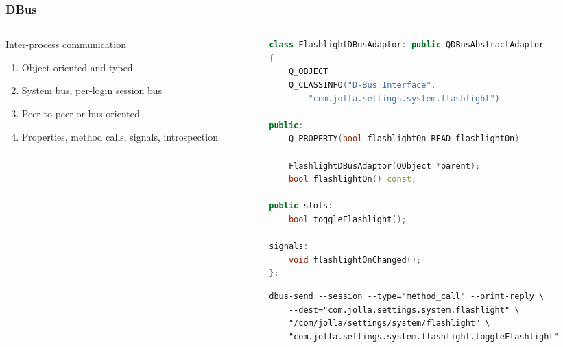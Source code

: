 \documentclass[
	notes=none,
	aspectratio=169
]{beamer}
\begin{document}
\begin{frame}[fragile]
\frametitle{DBus}

\begin{columns}[T]
\begin{column}[T]{0.5\textwidth}
\setlength{\parskip}{0.5em}

\vspace{0.4cm}
Inter-process communication
\begin{enumerate}
\setlength{\parskip}{0.5em}
\item Object-oriented and typed
\item System bus, per-login session bus
\item Peer-to-peer or bus-oriented
\item Properties, method calls, signals, introspection
\end{enumerate}

\end{column}
\begin{column}[T]{0.5\textwidth}

\begin{lstlisting}[language=cpp]
class FlashlightDBusAdaptor: public QDBusAbstractAdaptor
{
    Q_OBJECT
    Q_CLASSINFO("D-Bus Interface",
        "com.jolla.settings.system.flashlight")

public:
    Q_PROPERTY(bool flashlightOn READ flashlightOn)

    FlashlightDBusAdaptor(QObject *parent);
    bool flashlightOn() const;

public slots:
    bool toggleFlashlight();

signals:
    void flashlightOnChanged();
};
\end{lstlisting}

\begin{lstlisting}[language=sh2]
dbus-send --session --type="method_call" --print-reply \
    --dest="com.jolla.settings.system.flashlight" \
    "/com/jolla/settings/system/flashlight" \
    "com.jolla.settings.system.flashlight.toggleFlashlight"
\end{lstlisting}

\end{column}
\end{columns}

\end{frame}
\note{
}

\end{document}
